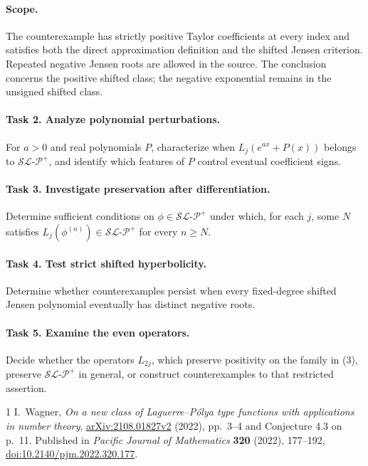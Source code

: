 \documentclass[10pt]{article}
\newcommand{\SLP}{\mathcal{SL\text{-}P}^{+}}
\begin{document}
\paragraph{Scope.}
The counterexample has strictly positive Taylor coefficients at every
index and satisfies both the direct approximation definition and the
shifted Jensen criterion. Repeated negative Jensen roots are allowed
in the source. The conclusion concerns the positive shifted class;
the negative exponential remains in the unsigned shifted class.

\paragraph{Task 2. Analyze polynomial perturbations.}
For \(a>0\) and real polynomials \(P\), characterize when
\(L_j(e^{ax}+P(x))\) belongs to \(\SLP\), and identify which
features of \(P\) control eventual coefficient signs.

\paragraph{Task 3. Investigate preservation after differentiation.}
Determine sufficient conditions on \(\phi\in\SLP\) under which,
for each \(j\), some \(N\) satisfies
\(L_j(\phi^{(n)})\in\SLP\) for every \(n\ge N\).

\paragraph{Task 4. Test strict shifted hyperbolicity.}
Determine whether counterexamples persist when every fixed-degree
shifted Jensen polynomial eventually has distinct negative roots.

\paragraph{Task 5. Examine the even operators.}
Decide whether the operators \(L_{2j}\), which preserve positivity
on the family in (3), preserve \(\SLP\) in general, or construct
counterexamples to that restricted assertion.

\begin{thebibliography}{1}
 I.~Wagner,
\emph{On a new class of Laguerre--P\'olya type functions with applications
in number theory},
\href{https://arxiv.org/abs/2108.01827v2}{arXiv:2108.01827v2} (2022),
pp.~3--4 and Conjecture 4.3 on p.~11.
Published in \emph{Pacific Journal of Mathematics} \textbf{320} (2022),
177--192, \href{https://doi.org/10.2140/pjm.2022.320.177}
{doi:10.2140/pjm.2022.320.177}.
\end{thebibliography}
\end{document}
